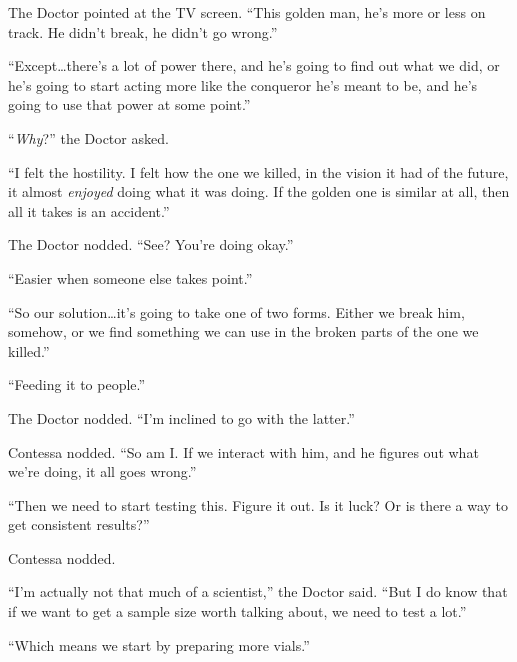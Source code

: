 The Doctor pointed at the TV screen.  ``This golden man, he's more or less on track.  He didn't break, he didn't go wrong.''



``Except\ldots there's a lot of power there, and he's going to find out what we did, or he's going to start acting more like the conqueror he's meant to be, and he's going to use that power at some point.''



``\emph{Why}?'' the Doctor asked.



``I felt the hostility.  I felt how the one we killed, in the vision it had of the future, it almost \emph{enjoyed} doing what it was doing.  If the golden one is similar at all, then all it takes is an accident.''



The Doctor nodded.  ``See?  You're doing okay.''



``Easier when someone else takes point.''



``So our solution\ldots it's going to take one of two forms.  Either we break him, somehow, or we find something we can use in the broken parts of the one we killed.''



``Feeding it to people.''



The Doctor nodded.  ``I'm inclined to go with the latter.''



Contessa nodded.  ``So am I.  If we interact with him, and he figures out what we're doing, it all goes wrong.''



``Then we need to start testing this.  Figure it out.  Is it luck?  Or is there a way to get consistent results?''



Contessa nodded.



``I'm actually not that much of a scientist,'' the Doctor said.  ``But I do know that if we want to get a sample size worth talking about, we need to test a lot.''



``Which means we start by preparing more vials.''



\sectionbreak



